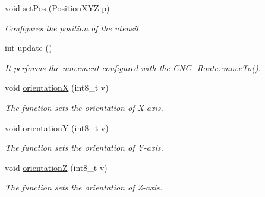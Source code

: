 \begin{DoxyCompactItemize}
void \hyperlink{class_c_n_c___router_a0297fd8151885d8cb29fb01e8c987a43}{set\+Pos} (\hyperlink{class_position_x_y_z}{Position\+X\+Y\+Z} p)
\begin{DoxyCompactList}\small\item\em Configures the position of the utensil. \end{DoxyCompactList}\item 
int \hyperlink{class_c_n_c___router_ad67d003f8bb12c60f9752126d47408f6}{update} ()
\begin{DoxyCompactList}\small\item\em It performs the movement configured with the C\+N\+C\+\_\+\+Route\+::move\+To(). \end{DoxyCompactList}\item 
void \hyperlink{class_c_n_c___router_adef23983c5aac16fa0431f861eb41fc2}{orientation\+X} (int8\+\_\+t v)
\begin{DoxyCompactList}\small\item\em The function sets the orientation of X-\/axis. \end{DoxyCompactList}\item 
void \hyperlink{class_c_n_c___router_abced37562004a4b303291be79e49a23b}{orientation\+Y} (int8\+\_\+t v)
\begin{DoxyCompactList}\small\item\em The function sets the orientation of Y-\/axis. \end{DoxyCompactList}\item 
void \hyperlink{class_c_n_c___router_a7dc30b35ae89245b4b8f53a0777472a5}{orientation\+Z} (int8\+\_\+t v)
\begin{DoxyCompactList}\small\item\em The function sets the orientation of Z-\/axis. \end{DoxyCompactList}\end{DoxyCompactItemize}
